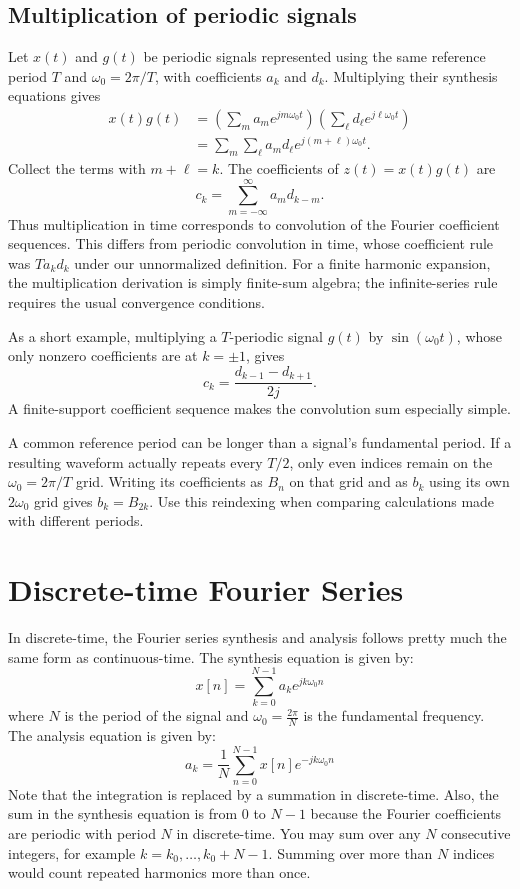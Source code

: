 \subsection{Multiplication of periodic signals}
\label{sec:w7l1-multiplication}
Let $x(t)$ and $g(t)$ be periodic signals represented using the same
reference period $T$ and $\omega_0=2\pi/T$, with coefficients $a_k$ and $d_k$.
Multiplying their synthesis equations gives
\begin{align*}
x(t)g(t)
&=\left(\sum_m a_m e^{jm\omega_0t}\right)
  \left(\sum_\ell d_\ell e^{j\ell\omega_0t}\right)\\
&=\sum_m\sum_\ell a_m d_\ell e^{j(m+\ell)\omega_0t}.
\end{align*}
Collect the terms with $m+\ell=k$. The coefficients of $z(t)=x(t)g(t)$ are
\[
\boxed{c_k=\sum_{m=-\infty}^{\infty}a_m d_{k-m}.}
\]
Thus multiplication in time corresponds to convolution of the Fourier
coefficient sequences. This differs from periodic convolution in time,
whose coefficient rule was $T a_k d_k$ under our unnormalized definition.
For a finite harmonic expansion, the multiplication derivation is simply
finite-sum algebra; the infinite-series rule requires the usual convergence
conditions.

As a short example, multiplying a $T$-periodic signal $g(t)$ by
$\sin(\omega_0t)$, whose only nonzero coefficients are at $k=\pm1$, gives
\[
c_k=\frac{d_{k-1}-d_{k+1}}{2j}.
\]
A finite-support coefficient sequence makes the convolution sum especially simple.

A common reference period can be longer than a signal's fundamental period.
If a resulting waveform actually repeats every $T/2$, only even indices
remain on the $\omega_0=2\pi/T$ grid. Writing its coefficients as $B_n$ on
that grid and as $b_k$ using its own $2\omega_0$ grid gives $b_k=B_{2k}$.
Use this reindexing when comparing calculations made with different periods.

\section{Discrete-time Fourier Series}
In discrete-time, the Fourier series synthesis and analysis follows pretty much the same form as continuous-time. The synthesis equation is given by:
\[
x[n] = \sum_{k=0}^{N-1} a_k e^{j k \omega_0 n}
\]
where $N$ is the period of the signal and $\omega_0 = \frac{2\pi}{N}$ is the fundamental frequency. The analysis equation is given by:
\[
a_k = \frac{1}{N} \sum_{n=0}^{N-1} x[n] e^{-j k \omega_0 n}
\]
Note that the integration is replaced by a summation in discrete-time. Also, the sum in the synthesis equation is from $0$ to $N-1$ because the Fourier coefficients are periodic with period $N$ in discrete-time. You may sum over any $N$ consecutive integers, for example $k=k_0,\ldots,k_0+N-1$. Summing over more than $N$ indices would count repeated harmonics more than once. 


